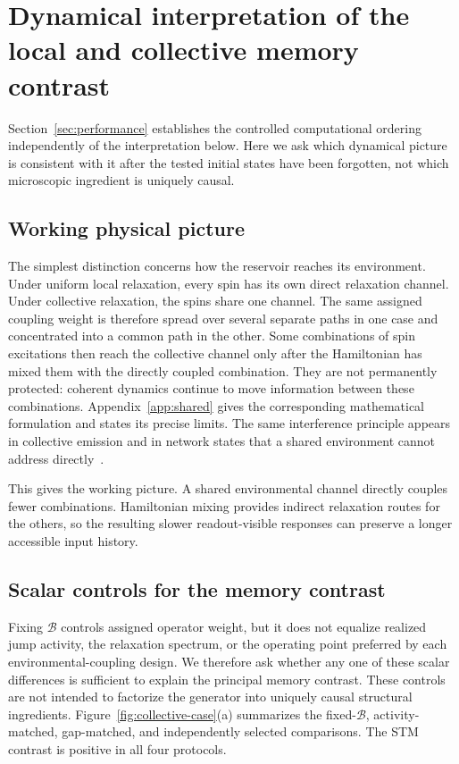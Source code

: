 \section{\texorpdfstring{Dynamical interpretation of the\\
local and collective memory contrast}{Dynamical interpretation of the local
and collective memory contrast}}
\label{sec:interpretation}

Section~\ref{sec:performance} establishes the controlled computational ordering
independently of the interpretation below. Here we ask which dynamical picture
is consistent with it after the tested initial states have been forgotten, not
which microscopic ingredient is uniquely causal.

\subsection{Working physical picture}

The simplest distinction concerns how the reservoir reaches its environment.
Under uniform local relaxation, every spin has its own direct relaxation
channel. Under collective relaxation, the spins share one channel. The same
assigned coupling weight is therefore spread over several separate paths in
one case and concentrated into a common path in the other. Some combinations
of spin excitations then reach the collective channel only after the
Hamiltonian has mixed them with the directly coupled combination. They are not
permanently protected: coherent dynamics continue to move information between
these combinations. Appendix~\ref{app:shared} gives the corresponding
mathematical formulation and states its precise limits. The same interference
principle appears in collective emission and in network states that a shared
environment cannot address directly~\cite{Dicke1954,Cabot2018}.

This gives the working picture. A shared environmental channel directly
couples fewer combinations. Hamiltonian mixing provides indirect relaxation
routes for the others, so the resulting slower readout-visible responses can
preserve a longer accessible input history.

\subsection{Scalar controls for the memory contrast}

Fixing \(\mathcal B\) controls assigned operator weight, but it does not
equalize realized jump activity, the relaxation spectrum, or the operating
point preferred by each environmental-coupling design. We therefore ask whether any one of
these scalar differences is sufficient to explain the principal memory
contrast. These controls are not intended to factorize the generator into
uniquely causal structural ingredients. Figure~\ref{fig:collective-case}(a) summarizes the
fixed-\(\mathcal B\), activity-matched, gap-matched, and independently selected
comparisons. The STM contrast is positive in all four protocols.

